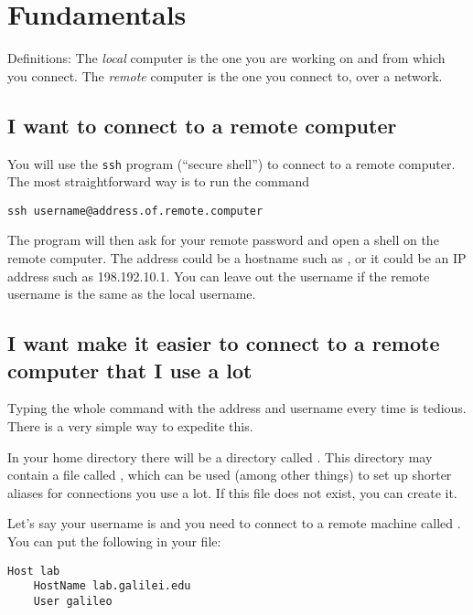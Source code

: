 \section{Fundamentals}

Definitions: The \emph{local} computer is the one you are working on and from
which you connect. The \emph{remote} computer is the one you connect to, over a
network.

\subsection{I want to connect to a remote computer}

You will use the \lstinline{ssh} program (``secure shell'') to connect to a
remote computer. The most straightforward way is to run the command

\begin{lstlisting}
ssh username@address.of.remote.computer
\end{lstlisting}

The program will then ask for your remote password and open a shell on the
remote computer. The address could be a hostname such as
, or it could be an IP address such as
198.192.10.1. You can leave out the username if the remote username is the same
as the local username.

\subsection{I want make it easier to connect to a remote computer that I use a
lot}

Typing the whole  command with the address and username every time is
tedious. There is a very simple way to expedite this.

In your home directory there will be a directory called . This
directory may contain a file called , which can be used (among
other things) to set up shorter aliases for connections you use a lot. If this
file does not exist, you can create it.

Let's say your username is  and you need to connect to a remote
machine called . You can put the following in your
 file:

\begin{lstlisting}
Host lab
    HostName lab.galilei.edu
    User galileo
\end{lstlisting}

